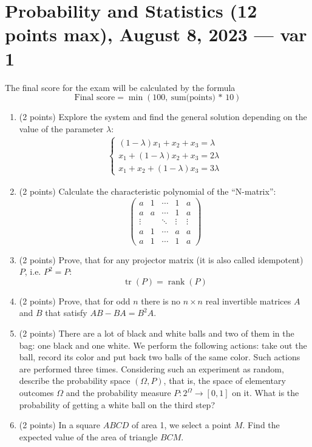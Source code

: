 \documentclass{article}
\begin{document}
\section*{Probability and Statistics (12 points max), August 8, 2023 — var 1}
The final score for the exam will be calculated by the formula
$$ \text{Final score} = \min(100,\ \text{sum(points) * 10})$$

\begin{enumerate}
  \item (2 points) Explore the system and find the general solution depending on the value of the parameter $\lambda$:
  \begin{align*}
    \begin{cases}
      (1 - \lambda)x_1 + x_2 + x_3 = \lambda \\
      x_1 + (1 - \lambda)x_2 + x_3 = 2\lambda \\
      x_1 + x_2 + (1 - \lambda)x_3 = 3\lambda
    \end{cases}
  \end{align*}

  \item (2 points) Calculate the characteristic polynomial of the ``N-matrix'':
  \[
    \begin{pmatrix}
      a & 1 & \cdots & 1 & a \\
      a & a & \cdots & 1 & a \\
      \vdots &  & \ddots & \vdots & \vdots \\
      a & 1 & \cdots & a & a \\
      a & 1 & \cdots & 1 & a
      \end{pmatrix}  \]
    
  \item (2 points) Prove, that for any projector matrix (it is also called idempotent) $P$, i.e. $P^2 = P$:
   $$ \operatorname{tr} (P) = \operatorname{rank} (P)$$

  \item (2 points) Prove, that for odd $n$ there is no $n \times n$ real invertible 
  matrices $A$ and $B$ that satisfy $AB - BA = B^2A$.
     
  \item (2 points) There are a lot of black and white balls and 
  two of them in the bag: one black and one white. 
  We perform the following actions: take out the ball, 
  record its color and put back two balls of the same color. 
  Such actions are performed three times. Considering such 
  an experiment as random, describe the probability space $(\Omega, P)$, 
  that is, the space of elementary outcomes $\Omega$ and 
  the probability measure $P: 2^{\Omega} \rightarrow [0, 1]$ on it. 
  What is the probability of getting a white ball on the third step?

  \item (2 points) In a square $ABCD$ of area 1, we select a point $M$. 
  Find the expected value of the area of triangle $BCM$.
\end{enumerate}
\end{document}
